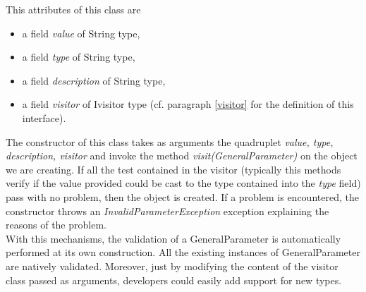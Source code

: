 \documentclass[a4paper,11pt] {ivoa}
\begin{document}
This attributes of this class are
\begin{itemize}
\item a field {\it value} of String type,\\
\item a field {\it type} of String type,\\
\item a field {\it description} of String type,\\
\item a field {\it visitor} of Ivisitor type (cf. paragraph \ref{visitor} for the definition of this interface).\\ 
\end{itemize}

The constructor of this class takes as arguments the quadruplet  {\it  value, type, description, visitor} and invoke the method {\it visit(GeneralParameter)} on the object we are creating. If all the test contained in the visitor (typically this methods verify if the value provided could be cast to the type contained into the {\it type} field) pass with no problem, then the object is created. If a problem is encountered, the constructor throws an {\it InvalidParameterException } exception explaining the reasons of the problem.\\

With this mechanisms, the validation of a GeneralParameter is automatically performed at its own construction. All the existing instances of GeneralParameter are natively validated. Moreover, just by modifying the content of the visitor class passed as arguments, developers could easily add support for new types. 
\end{document}
